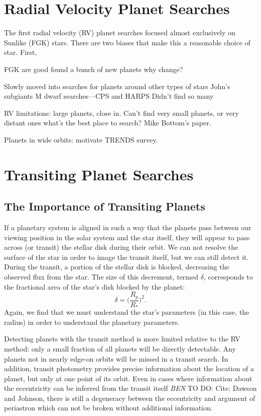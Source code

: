 \documentclass[12pt]{caltech_thesis}
\newcommand{\todo}[3]{{\color{#2} \emph{#1} TO DO: #3}}
\newcommand{\btmtodo}[1]{\todo{BEN}{red}{#1}}
\begin{document}
\section{Radial Velocity Planet Searches}
The first radial velocity (RV) planet searches focused almost exclusively on Sunlike
(FGK) stars. 
There are two biases that make this a reasonable choice of star. 
First, 

FGK are good
found a bunch of new planets
why change?

Slowly moved into searches for planets around other types of stars
John's subgiants
M dwarf searches---CPS and HARPS
Didn't find so many

RV limitations: large planets, close in.
Can't find very small planets, or very distant ones
what's the best place to search? Mike Bottom's paper.

Planets in wide orbits: motivate TRENDS survey.

\section{Transiting Planet Searches}
\subsection{The Importance of Transiting Planets}
If a planetary system is aligned in such a way that the planets pass between our
viewing position in the solar system and the star itself, they will appear to pass
across (or transit) the stellar disk during their orbit.
We can not resolve the surface of the star in order to image the transit itself, but
we can still detect it. 
During the transit, a portion of the stellar disk is blocked, decreasing the observed
flux from the star. 
The size of this decrement, termed $\delta$, corresponds to the fractional area of the star's disk blocked by the planet:
\begin{equation}
\delta = \bigg(\frac{R_p}{R_*}\bigg)^2.
\end{equation}
Again, we find that we must understand the star's parameters (in this case, the radius)
in order to understand the planetary parameters.

Detecting planets with the transit method is more limited relative to the RV method:
only a small fraction of all planets will be directly detectable. 
Any planets not in nearly edge-on orbits will be missed in a transit search.
In addition, transit photometry provides precise information about the location 
of a planet, but only at one point of its orbit.
Even in cases where information about the eccentricity can be inferred from the
transit itself \btmtodo{Cite: Dawson and Johnson}, there is still a degeneracy
between the eccentricity and argument of periastron which can not be broken without
additional information.
\end{document}
